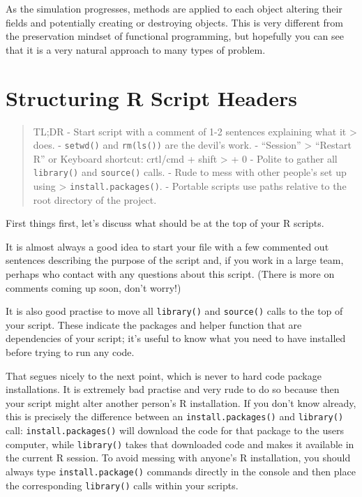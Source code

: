 \documentclass[
  12pt,
]{book}
\begin{document}
As the simulation progresses, methods are applied to each object altering their fields and potentially creating or destroying objects. This is very different from the preservation mindset of functional programming, but hopefully you can see that it is a very natural approach to many types of problem.

\hypertarget{structuring-r-script-headers}{%
\section{Structuring R Script Headers}\label{structuring-r-script-headers}}

\begin{quote}
TL;DR
- Start script with a comment of 1-2 sentences explaining what it \textgreater{} does.
- \texttt{setwd()} and \texttt{rm(ls())} are the devil's work.
- ``Session'' \textgreater{} ``Restart R'' or Keyboard shortcut: crtl/cmd + shift \textgreater{} + 0
- Polite to gather all \texttt{library()} and \texttt{source()} calls.
- Rude to mess with other people's set up using \textgreater{} \texttt{install.packages()}.
- Portable scripts use paths relative to the root directory of the project.
\end{quote}

First things first, let's discuss what should be at the top of your R scripts.

It is almost always a good idea to start your file with a few commented out sentences describing the purpose of the script and, if you work in a large team, perhaps who contact with any questions about this script. (There is more on comments coming up soon, don't worry!)

It is also good practise to move all \texttt{library()} and \texttt{source()} calls to the top of your script. These indicate the packages and helper function that are dependencies of your script; it's useful to know what you need to have installed before trying to run any code.

That segues nicely to the next point, which is never to hard code package installations. It is extremely bad practise and very rude to do so because then your script might alter another person's R installation. If you don't know already, this is precisely the difference between an \texttt{install.packages()} and \texttt{library()} call: \texttt{install.packages()} will download the code for that package to the users computer, while \texttt{library()} takes that downloaded code and makes it available in the current R session. To avoid messing with anyone's R installation, you should always type \texttt{install.package()} commands directly in the console and then place the corresponding \texttt{library()} calls within your scripts.
\end{document}

